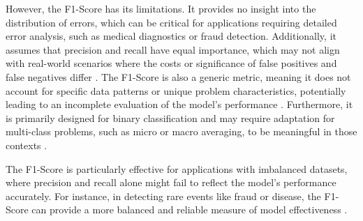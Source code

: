 However, the F1-Score has its limitations. It provides no insight into the distribution of errors, which can be critical for applications requiring detailed error analysis, such as medical diagnostics or fraud detection. Additionally, it assumes that precision and recall have equal importance, which may not align with real-world scenarios where the costs or significance of false positives and false negatives differ \cite{serokell_f1_score_guide}. The F1-Score is also a generic metric, meaning it does not account for specific data patterns or unique problem characteristics, potentially leading to an incomplete evaluation of the model's performance \cite{serokell_f1_score_guide}. Furthermore, it is primarily designed for binary classification and may require adaptation for multi-class problems, such as micro or macro averaging, to be meaningful in those contexts \cite{serokell_f1_score_guide}.

The F1-Score is particularly effective for applications with imbalanced datasets, where precision and recall alone might fail to reflect the model's performance accurately. For instance, in detecting rare events like fraud or disease, the F1-Score can provide a more balanced and reliable measure of model effectiveness \cite{appliedai_evaluation_metrics}.





